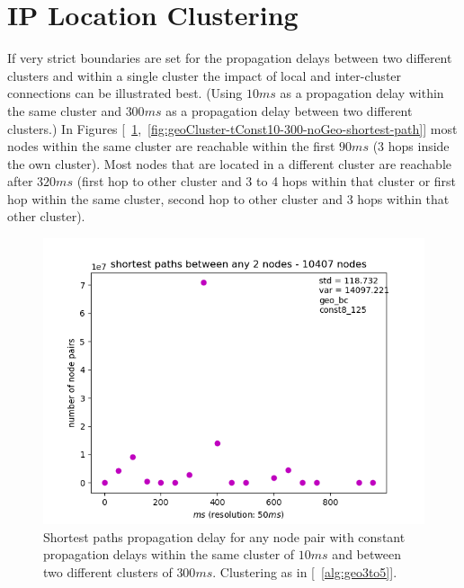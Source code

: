 \documentclass[a4paper, oneside]{discothesis}
\begin{document}
\section{IP Location Clustering}
If very strict boundaries are set for the propagation delays between two different clusters and within a single cluster the impact of local and inter-cluster connections can be illustrated best. (Using $10ms$ as a propagation delay within the same cluster and $300ms$ as a propagation delay between two different clusters.) In Figures [~\ref{fig:geoCluster-tConst10-300-geo-shortest-path},~\ref{fig:geoCluster-tConst10-300-noGeo-shortest-path}] most nodes within the same cluster are reachable within the first $90ms$ (3 hops inside the own cluster). Most nodes that are located in a different cluster are reachable after $320ms$ (first hop to other cluster and 3 to 4 hops within that cluster or first hop within the same cluster, second hop to other cluster and 3 hops within that other cluster).

\begin{figure}
    \centering
    \includegraphics[width=.8\columnwidth]{figures/geoCluster/tConst10-300/geo/final-shortest-paths-between-any-nodes-10407-nodes.png}
    \caption{Shortest paths propagation delay for any node pair with constant propagation delays within the same cluster of $10ms$ and between two different clusters of $300ms$. Clustering as in [~\ref{alg:geo3to5}].}
    \label{fig:geoCluster-tConst10-300-geo-shortest-path}
\end{figure}
\end{document}
